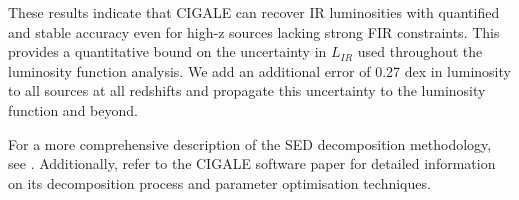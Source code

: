 These results indicate that CIGALE can recover IR luminosities with quantified and stable accuracy even for high-z sources lacking strong FIR constraints. This provides a quantitative bound on the uncertainty in $L_{IR}$ used throughout the luminosity function analysis. We add an additional error of 0.27 dex in luminosity to all sources at all redshifts and propagate this uncertainty to the luminosity function and beyond.

For a more comprehensive description of the SED decomposition methodology, see \cite{cowley_decoupled_2018}. Additionally, refer to the CIGALE software paper \citep{boquien_cigale_2019} for detailed information on its decomposition process and parameter optimisation techniques.




